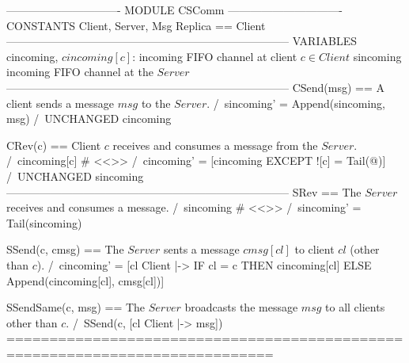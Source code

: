 \documentclass{article}
\begin{document}
\begin{tla}
------------------------------- MODULE CSComm -------------------------------
CONSTANTS Client, Server, Msg
Replica == Client 
-----------------------------------------------------------------------------
VARIABLES
    cincoming,  \* $cincoming[c]$: incoming FIFO channel at client $c \in Client$
    sincoming   \* incoming FIFO channel at the $Server$
-----------------------------------------------------------------------------
CSend(msg) == \* A client sends a message $msg$ to the $Server$.
    /\ sincoming' = Append(sincoming, msg)
    /\ UNCHANGED cincoming

CRev(c) == \* Client $c$ receives and consumes a message from the $Server$.                  
    /\ cincoming[c] # <<>>
    /\ cincoming' = [cincoming EXCEPT ![c] = Tail(@)]
    /\ UNCHANGED sincoming
-----------------------------------------------------------------------------
SRev == \* The $Server$ receives and consumes a message.      
    /\ sincoming # <<>>
    /\ sincoming' = Tail(sincoming)

SSend(c, cmsg) == \* The $Server$ sents a message $cmsg[cl]$ to client $cl$ (other than $c$).
    /\ cincoming' = [cl \in Client |-> IF cl = c 
                                       THEN cincoming[cl] 
                                       ELSE Append(cincoming[cl], cmsg[cl])]

SSendSame(c, msg) == \* The $Server$ broadcasts the message $msg$ to all clients other than $c$.
    /\ SSend(c, [cl \in Client |-> msg])
=============================================================================
\end{tla}
\end{document}
